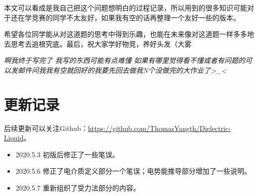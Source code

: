 \documentclass{ctexart}
\begin{document}
	本文可以看成是我自己把这个问题想明白的过程记录，所以用到的很多知识可能对于还在学竞赛的同学不太友好，如果我有空的话再整理一个友好一些的版本。

	希望各位同学能从对这道题的思考中得到乐趣，也能在未来像对这道题一样多多地去思考去追根究底。最后，祝大家学好物竞，养好头发（大雾
	
	\textit{啊我终于写完了 我写的东西可能有点难懂 如果有哪里觉得看不懂或者有问题的可以发邮件问我我有空就回\quad 好的我要先回去做我N个没做完的大作业了>\_<}
	
	\nocite{Shu}
	\nocite{Jackson}
	\nocite{Zhao}
	\nocite{Wu}
	\nocite{Liu}
	
	
	
	
	\section*{更新记录}
	
	后续更新可以关注Github：\url{https://github.com/ThomasYangth/Dielectric-Liquid}。
	
	\begin{itemize}
		\item 2020.5.3 初版后修正了一些笔误。
		\item 2020.5.6 修正了电介质定义部分一个笔误；电势能推导部分增加了一些说明。
		\item 2020.5.7 重新组织了受力法部分的内容。
	\end{itemize}
\end{document}
